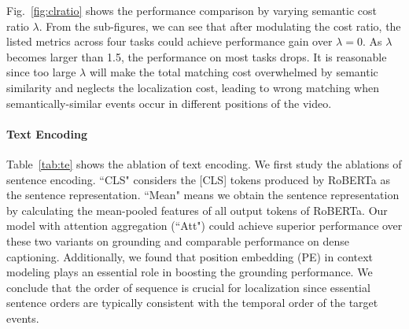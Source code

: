 Fig.~\ref{fig:clratio} shows the performance comparison by varying semantic cost ratio ${\lambda}$. From the sub-figures, we can see that after modulating the cost ratio, the listed metrics across four tasks could achieve performance gain over ${\lambda}=0$. As ${\lambda}$ becomes larger than 1.5, the performance on most tasks drops. It is reasonable since too large ${\lambda}$ will make the total matching cost overwhelmed by semantic similarity and neglects the localization cost, leading to wrong matching when semantically-similar events occur in different positions of the video.  


\begin{table}[]
\caption{Ablation studies of text encoding.}
\vspace{-0.5em}
\small
\renewcommand\arraystretch{1.0}
\centering
        \makeatletter{}\makeatother
\label{tab:te}
\vspace{-1.0em}
\end{table}

\vspace{-1.0em}
\paragraph{\textbf{Text Encoding}}

Table~\ref{tab:te} shows the ablation of text encoding. We first study the ablations of sentence encoding. ``CLS" considers the [CLS] tokens produced by RoBERTa as the sentence representation. ``Mean" means we obtain the sentence representation by calculating the mean-pooled features of all output tokens of RoBERTa. Our model with attention aggregation (``Att") could achieve superior performance over these two variants on grounding and comparable performance on dense captioning. Additionally, we found that position embedding (PE) in context modeling plays an essential role in boosting the grounding performance. We conclude that the order of sequence is crucial for localization since essential sentence orders are typically consistent with the temporal order of the target events.

